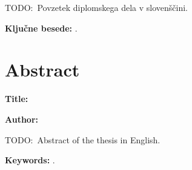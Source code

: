 \noindent TODO:\ Povzetek diplomskega dela v slovenščini.

\bigskip

\noindent\textbf{Ključne besede:} \tkeywords.
\clearemptydoublepage{}

\chapter*{Abstract}

\noindent\textbf{Title:} \ttitleEn{}
\bigskip

\noindent\textbf{Author:} \tauthor{}
\bigskip

\noindent TODO:\ Abstract of the thesis in English.
\bigskip

\noindent\textbf{Keywords:} \tkeywordsEn.
\clearemptydoublepage{}

\mainmatter{}
\setcounter{page}{1}
\pagestyle{fancy}






\cleardoublepage{}

\printbibliography[heading=bibintoc,title={Literatura}]


